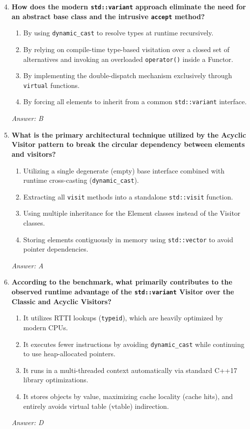 \begin{enumerate}
    \setcounter{enumi}{3} %
    \item \textbf{How does the modern \texttt{std::variant} approach eliminate the need for an abstract base class and the intrusive \texttt{accept} method?}
    \begin{enumerate}[label=\textbf{\Alph*.}]
        \item By using \texttt{dynamic\_cast} to resolve types at runtime recursively.
        \item By relying on compile-time type-based visitation over a closed set of alternatives and invoking an overloaded \texttt{operator()} inside a Functor.
        \item By implementing the double-dispatch mechanism exclusively through \texttt{virtual} functions.
        \item By forcing all elements to inherit from a common \texttt{std::variant} interface.
    \end{enumerate}
    \textit{Answer: B}
    
    \item \textbf{What is the primary architectural technique utilized by the Acyclic Visitor pattern to break the circular dependency between elements and visitors?}
    \begin{enumerate}[label=\textbf{\Alph*.}]
        \item Utilizing a single degenerate (empty) base interface combined with runtime cross-casting (\texttt{dynamic\_cast}).
        \item Extracting all \texttt{visit} methods into a standalone \texttt{std::visit} function.
        \item Using multiple inheritance for the Element classes instead of the Visitor classes.
        \item Storing elements contiguously in memory using \texttt{std::vector} to avoid pointer dependencies.
    \end{enumerate}
    \textit{Answer: A}

    \item \textbf{According to the benchmark, what primarily contributes to the observed runtime advantage of the \texttt{std::variant} Visitor over the Classic and Acyclic Visitors?}
    \begin{enumerate}[label=\textbf{\Alph*.}]
        \item It utilizes RTTI lookups (\texttt{typeid}), which are heavily optimized by modern CPUs.
        \item It executes fewer instructions by avoiding \texttt{dynamic\_cast} while continuing to use heap-allocated pointers.
        \item It runs in a multi-threaded context automatically via standard C++17 library optimizations.
        \item It stores objects by value, maximizing cache locality (cache hits), and entirely avoids virtual table (vtable) indirection.
    \end{enumerate}
    \textit{Answer: D}


\end{enumerate}
